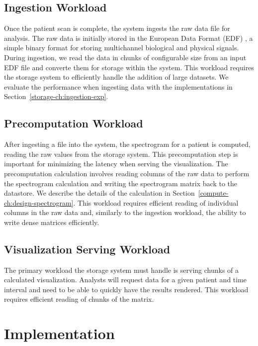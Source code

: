 \subsection{Ingestion Workload}

Once the patient scan is complete, the system ingests the raw data file for
analysis. The raw data is initially stored in the European Data Format (EDF)
\cite{edf}, a simple binary format for storing multichannel biological and
physical signals. During ingestion, we read the data in chunks of configurable
size from an input EDF file and converte them for storage within the system.
This workload requires the storage system to efficiently handle the addition of
large datasets. We evaluate the performance when ingesting data with the
implementations in Section~\ref{storage-ch:ingestion-exp}.


\subsection{Precomputation Workload}

After ingesting a file into the system, the spectrogram for a patient is
computed, reading the raw values from the storage system. This precomputation
step is important for minimizing the latency when serving the visualization.
The precomputation calculation involves reading columns of the raw data to
perform the spectrogram calculation and writing the spectrogram matrix back to
the datastore. We describe the details of the calculation in
Section~\ref{compute-ch:design-spectrogram}. This workload requires efficient
reading of individual columns in the raw data and, similarly to the ingestion
workload, the ability to write dense matrices efficiently.

\subsection{Visualization Serving Workload}

The primary workload the storage system must handle is serving chunks of a
calculated visualization. Analysts will request data for a given patient and
time interval and need to be able to quickly have the results rendered. This
workload requires efficient reading of chunks of the matrix.

\section{Implementation}


